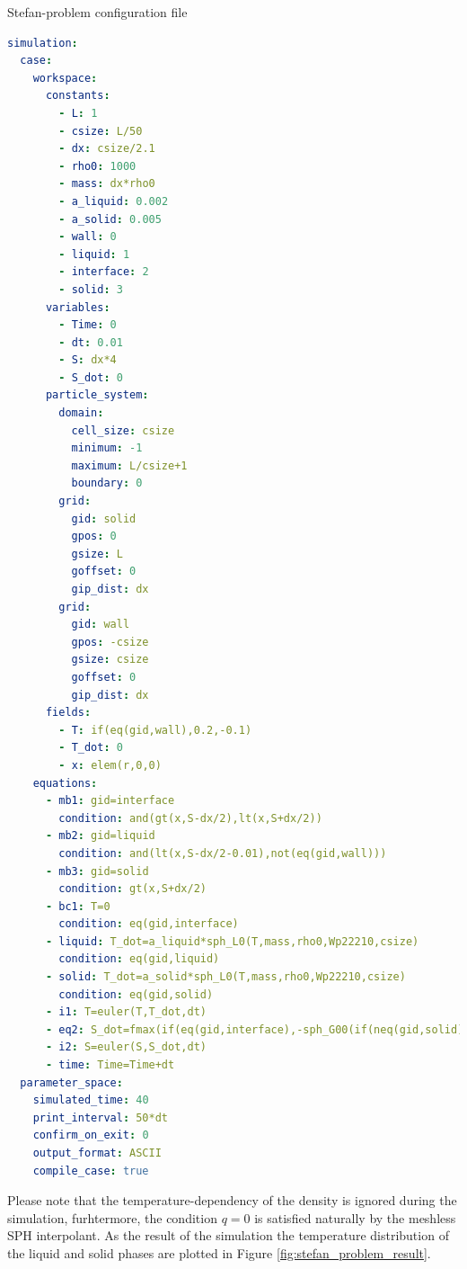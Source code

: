 \documentclass[a4paper,12pt,openany]{book}
\theoremstyle{break}
\begin{document}
\begin{samepage}
\begin{example}{Stefan-problem configuration file}{}
\lstset{basicstyle=\tiny}
\begin{lstlisting}[language=YAML]
simulation:
  case:
    workspace:
      constants:
        - L: 1
        - csize: L/50
        - dx: csize/2.1
        - rho0: 1000
        - mass: dx*rho0
        - a_liquid: 0.002
        - a_solid: 0.005
        - wall: 0
        - liquid: 1
        - interface: 2
        - solid: 3
      variables:
        - Time: 0
        - dt: 0.01
        - S: dx*4
        - S_dot: 0
      particle_system:
        domain:
          cell_size: csize
          minimum: -1
          maximum: L/csize+1
          boundary: 0
        grid:
          gid: solid
          gpos: 0
          gsize: L
          goffset: 0
          gip_dist: dx
        grid:
          gid: wall
          gpos: -csize
          gsize: csize
          goffset: 0
          gip_dist: dx
      fields:
        - T: if(eq(gid,wall),0.2,-0.1)
        - T_dot: 0
        - x: elem(r,0,0)
    equations:
      - mb1: gid=interface
        condition: and(gt(x,S-dx/2),lt(x,S+dx/2))
      - mb2: gid=liquid
        condition: and(lt(x,S-dx/2-0.01),not(eq(gid,wall)))
      - mb3: gid=solid
        condition: gt(x,S+dx/2)
      - bc1: T=0
        condition: eq(gid,interface)
      - liquid: T_dot=a_liquid*sph_L0(T,mass,rho0,Wp22210,csize)
        condition: eq(gid,liquid)
      - solid: T_dot=a_solid*sph_L0(T,mass,rho0,Wp22210,csize)
        condition: eq(gid,solid)
      - i1: T=euler(T,T_dot,dt)
      - eq2: S_dot=fmax(if(eq(gid,interface),-sph_G00(if(neq(gid,solid),T,0),mass,rho0,Wp22210,csize),0))
      - i2: S=euler(S,S_dot,dt)
      - time: Time=Time+dt
  parameter_space:
    simulated_time: 40
    print_interval: 50*dt
    confirm_on_exit: 0
    output_format: ASCII
    compile_case: true
\end{lstlisting}
\end{example}
\end{samepage}
Please note that the temperature-dependency of the density is ignored during the simulation, furhtermore, the condition $q=0$ is satisfied naturally by the meshless SPH interpolant. As the result of the simulation the temperature distribution of the liquid and solid phases are plotted in Figure \ref{fig:stefan_problem_result}.
\end{document}
